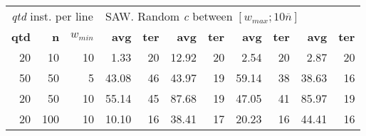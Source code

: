 \begin{table}
\begin{tabular}{@{\extracolsep{4pt}}rrrrrrrrrrr@{}}
\multicolumn{3}{l}{\emph{qtd} inst. per line} & \multicolumn{8}{l}{SAW. Random \emph{c} between \([w_{max}; 10\overline{n}]\)}\\
\cline{1-3}\cline{4-11}
\textbf{qtd} & \textbf{n} & \(w_{min}\) & \textbf{avg} & \textbf{ter}  & \textbf{avg} & \textbf{ter} & \textbf{avg} & \textbf{ter} & \textbf{avg} & \textbf{ter}\\
\cline{1-3}\cline{4-5}\cline{6-7}\cline{8-9}\cline{10-11}
~20 &  10 & 10 &  1.33 & 20 & 12.92 & 20 &  2.54 & 20 &  2.87 & 20\\
~50 &  50 &  5 & 43.08 & 46 & 43.97 & 19 & 59.14 & 38 & 38.63 & 16\\
~20 &  50 & 10 & 55.14 & 45 & 87.68 & 19 & 47.05 & 41 & 85.97 & 19\\
~20 & 100 & 10 & 10.10 & 16 & 38.41 & 17 & 20.23 & 16 & 44.41 & 16\\
\hline
\end{tabular}
\end{table}

